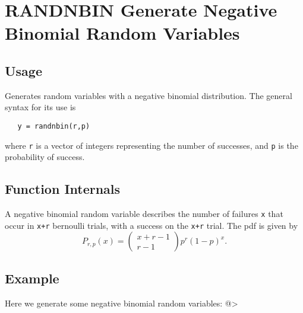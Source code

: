 \section{RANDNBIN Generate Negative Binomial Random Variables}

\subsection{Usage}

Generates random variables with a negative binomial distribution.
The general syntax for its use is
\begin{verbatim}
   y = randnbin(r,p)
\end{verbatim}
where \verb|r| is a vector of integers representing the number of
successes, and \verb|p| is the probability of success.
\subsection{Function Internals}

A negative binomial random variable describes the number of failures
\verb|x| that occur in \verb|x+r| bernoulli trials, with a success on the 
\verb|x+r| trial.  The pdf is given by
\[
  P_{r,p}(x)=\left(\begin{matrix} x+r-1 \\ r-1 \end{matrix}\right)p^r(1-p)^x.
\]
\subsection{Example}

Here we generate some negative binomial random variables:
@>
